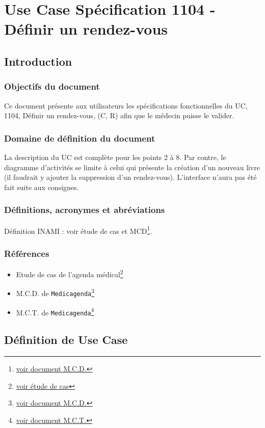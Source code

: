 \chapter{Use Case Spécification 1104 - Définir un rendez-vous}

\section{Introduction}

\subsection{Objectifs du document}
Ce document présente aux utilisateurs les spécifications fonctionnelles du UC,
1104, Définir un rendez-vous, (C, R) afin que le médecin puisse le valider.

\subsection{Domaine de définition du document}
La description du UC est complète pour les points 2 à 8. Par contre, le
diagramme d’activités se limite à celui qui présente la création d’un nouveau 
livre (il faudrait y ajouter la suppression d’un rendez-vous). 
L'interface n'aura pas été fait suite aux consignes.

\subsection{Définitions, acronymes et abréviations}
Définition INAMI : voir étude de cas et MCD\footnote{\href{../MCD/MCD.pdf}{voir document M.C.D.}}.

\subsection{Références}
\begin{itemize}
	\item[] Etude de cas de l'agenda
		médical\footnote{\href{../Enonce_Travail_Synthese_14-15.pdf}{voir
		étude de cas}}
	\item[] M.C.D. de \texttt{Medicagenda}\footnote{\href{../MCD/MCD.pdf}{voir document M.C.D.}}
	\item[] M.C.T. de \texttt{Medicagenda}\footnote{\href{./MCT.pdf}{voir document M.C.T.}}
\end{itemize}
\newpage

\section{Définition de Use Case}
